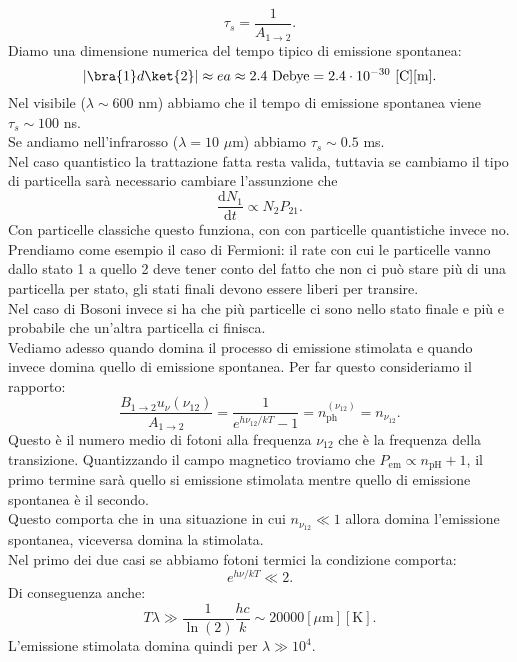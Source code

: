 \[
\tau_{s}=\frac{1}{A_{1\to 2}}
.\] 
Diamo una dimensione numerica del tempo tipico di emissione spontanea:
\[
    \left|\bra{1}d\ket{2}\right|\approx ea \approx 2.4 \text{ Debye} = 2.4\cdot 10^{-30}\text{ [C][m]}
.\] 
Nel visibile ($\lambda\sim 600$ nm) abbiamo che il tempo di emissione spontanea viene $\tau_s \sim 100$  ns.\\
Se andiamo nell'infrarosso ($\lambda  = 10$ $\mu$m) abbiamo $\tau_s\sim 0.5$  ms.\\
Nel caso quantistico la trattazione fatta resta valida, tuttavia se cambiamo il tipo di particella sarà necessario cambiare l'assunzione che 
\[
\frac{\text{d} N_1}{\text{d} t} \propto N_{2}P_{21}
.\]   
Con particelle classiche questo funziona, con con particelle quantistiche invece no. \\
Prendiamo come esempio il caso di Fermioni: il rate con cui le particelle vanno dallo stato 1 a quello 2 deve tener conto del fatto che non ci può stare più di una particella per stato, gli stati finali devono essere liberi per transire.\\
Nel caso di Bosoni invece si ha che più particelle ci sono nello stato finale e più e probabile che un'altra particella ci finisca.\\
Vediamo adesso quando domina il processo di emissione stimolata e quando invece domina quello di emissione spontanea. Per far questo consideriamo il rapporto:
\[
    \frac{B_{1\to 2}u_\nu(\nu_{12})}{A_{1\to 2}} = \frac{1}{e^{h\nu_{12} /kT}-1}
    = n_\text{ph}^{(\nu_{12})} = n_{\nu_{12}}
.\] 
Questo è il numero medio di fotoni alla frequenza $\nu_{12}$  che è la frequenza della transizione. Quantizzando il campo magnetico troviamo che $P_\text{em} \propto n_\text{pH} + 1$, il primo termine sarà quello si emissione stimolata mentre quello di emissione spontanea è il secondo.\\
Questo comporta che in una situazione in cui $n_{\nu_{12}}\ll 1$ allora domina l'emissione spontanea, viceversa domina la stimolata.\\
Nel primo dei due casi se abbiamo fotoni termici la condizione comporta:
\[
e^{h\nu /kT}\ll 2
.\] 
Di conseguenza anche:
\[
    T\lambda\gg \frac{1}{\ln(2)}\frac{hc}{k}\sim 20000 [\mu\text{m}][\text{K}]
.\] 
L'emissione stimolata domina quindi per $\lambda\gg 10^4$.\\

